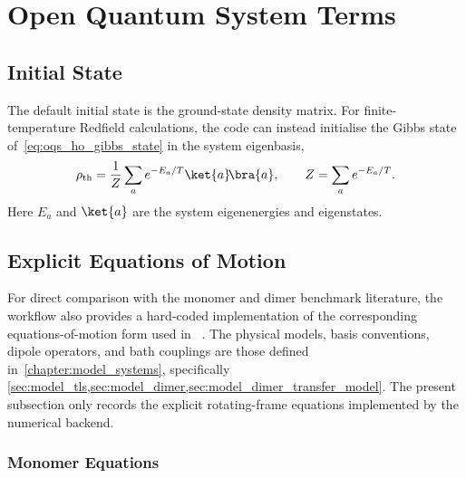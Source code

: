 \section{Open Quantum System Terms}
\label{app:sec:oqs_evolution}

\subsection{Initial State}

The default initial state is the ground-state density matrix. For
finite-temperature Redfield calculations, the code can instead initialise the
Gibbs state of~\autoref{eq:oqs_ho_gibbs_state} in the system eigenbasis,
\begin{equation*}
\rho_{\mathrm{th}}
=
\frac{1}{Z}\sum_{a} e^{-E_a/T}\ket{a}\!\bra{a},
\qquad
Z=\sum_a e^{-E_a/T}.
\end{equation*}
Here \(E_a\) and \(\ket{a}\) are the system eigenenergies and eigenstates.


\subsection{Explicit Equations of Motion}
\label{app:sec:paper_eqs_explicit_eoms}

For direct comparison with the monomer and dimer benchmark literature, the
workflow also provides a hard-coded implementation of the corresponding
equations-of-motion form used in
~\cite{mancaletal2006twodimensionalopticalthreepulse,pisliakovetal2006twodimensionalopticalthreepulse}.
The physical models, basis conventions, dipole operators, and bath couplings
are those defined in~\autoref{chapter:model_systems}, specifically
\cref{sec:model_tls,sec:model_dimer,sec:model_dimer_transfer_model}.
The present subsection only records the explicit rotating-frame equations
implemented by the numerical backend.


\subsubsection{Monomer Equations}

